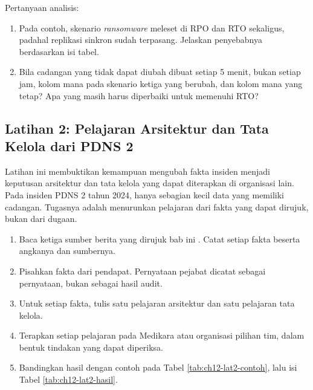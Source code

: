 Pertanyaan analisis:
\begin{enumerate}
  \item Pada contoh, skenario \textit{ransomware} meleset di RPO dan RTO sekaligus, padahal
        replikasi sinkron sudah terpasang. Jelaskan penyebabnya berdasarkan isi tabel.
  \item Bila cadangan yang tidak dapat diubah dibuat setiap 5 menit, bukan setiap jam, kolom mana
        pada skenario ketiga yang berubah, dan kolom mana yang tetap? Apa yang masih harus
        diperbaiki untuk memenuhi RTO?
\end{enumerate}

\subsection*{Latihan 2: Pelajaran Arsitektur dan Tata Kelola dari PDNS 2}

Latihan ini membuktikan kemampuan mengubah fakta insiden menjadi keputusan arsitektur dan tata
kelola yang dapat diterapkan di organisasi lain. Pada insiden PDNS 2 tahun 2024, hanya sebagian
kecil data yang memiliki cadangan. Tugasnya adalah menurunkan pelajaran dari fakta yang dapat
dirujuk, bukan dari dugaan.

\begin{enumerate}
  \item Baca ketiga sumber berita yang dirujuk bab ini \cite{c12-antara2024,c12-cnn2024,c12-cnbc2024}.
        Catat setiap fakta beserta angkanya dan sumbernya.
  \item Pisahkan fakta dari pendapat. Pernyataan pejabat dicatat sebagai pernyataan, bukan sebagai
        hasil audit.
  \item Untuk setiap fakta, tulis satu pelajaran arsitektur dan satu pelajaran tata kelola.
  \item Terapkan setiap pelajaran pada Medikara atau organisasi pilihan tim, dalam bentuk tindakan
        yang dapat diperiksa.
  \item Bandingkan hasil dengan contoh pada Tabel \ref{tab:ch12-lat2-contoh}, lalu isi Tabel
        \ref{tab:ch12-lat2-hasil}.
\end{enumerate}

